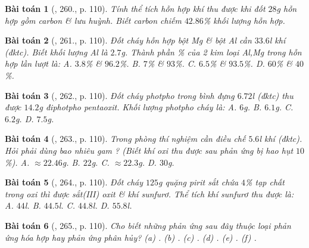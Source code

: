 \documentclass{article}
\newtheorem{baitoan}{Bài toán}
\begin{document}
\begin{baitoan}[\cite{An_400_BT_Hoa_Hoc_8_2020}, 260., p. 110]
	Tính thể tích hỗn hợp khí thu được khi đốt $28$\emph{g} hỗn hợp gồm carbon \& lưu huỳnh. Biết carbon chiếm $42.86$\% khối lượng hỗn hợp.
\end{baitoan}

\begin{baitoan}[\cite{An_400_BT_Hoa_Hoc_8_2020}, 261., p. 110]
	Đốt cháy hỗn hợp bột \emph{Mg} \& bột \emph{Al} cần $33.6$\emph{l} khí \emph{} (đktc). Biết khối lượng \emph{Al} là $2.7$\emph{g}. Thành phần \% của 2 kim loại \emph{Al,Mg} trong hỗn hợp lần lượt là: {\sf A.} $3.8$\% \& $96.2$\%. {\sf B.} $7$\% \& $93$\%. {\sf C.} $6.5$\% \& $93.5$\%. {\sf D.} $60$\% \& $40$\%.
\end{baitoan}

\begin{baitoan}[\cite{An_400_BT_Hoa_Hoc_8_2020}, 262., p. 110]
	Đốt cháy photpho trong bình đựng $6.72$\emph{l } (đktc) thu được $14.2$\emph{g} điphotpho pentaoxit. Khối lượng photpho cháy là: {\sf A.} $6$\emph{g}. {\sf B.} $6.1$\emph{g}. {\sf C.} $6.2$\emph{g}. {\sf D.} $7.5$\emph{g}.
\end{baitoan}

\begin{baitoan}[\cite{An_400_BT_Hoa_Hoc_8_2020}, 263., p. 110]
	Trong phòng thí nghiệm cần điều chế $5.6$\emph{l} khí \emph{} (đktc). Hỏi phải dùng bao nhiêu gam \emph{}? (Biết khí oxi thu được sau phản ứng bị hao hụt $10$\%). {\sf A.} $\approx22.46$\emph{g}. {\sf B.} $22$\emph{g}. {\sf C.} $\approx22.3$\emph{g}. {\sf D.} $30$\emph{g}.
\end{baitoan}

\begin{baitoan}[\cite{An_400_BT_Hoa_Hoc_8_2020}, 264., p. 110]
	Đốt cháy $125$\emph{g} quặng pirit sắt chứa $4$\% tạp chất trong oxi thì được sắt(III) oxit \& khí sunfurơ. Thể tích khí sunfurơ thu được là: {\sf A.} $44$\emph{l}. {\sf B.} $44.5$\emph{l}. {\sf C.} $44.8$\emph{l}. {\sf D.} $55.8$\emph{l}.
\end{baitoan}

\begin{baitoan}[\cite{An_400_BT_Hoa_Hoc_8_2020}, 265., p. 110]
	Cho biết những phản ứng sau đây thuộc loại phản ứng hóa hợp hay phản ứng phân hủy? (a) \emph{}. (b) \emph{}. (c) \emph{}. (d) \emph{}. (e) \emph{}. (f) \emph{}.
\end{baitoan}
\end{document}
